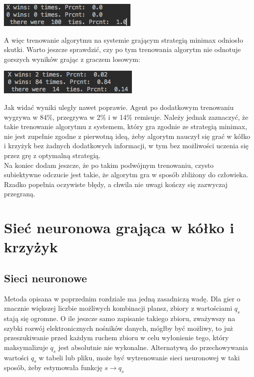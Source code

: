\documentclass[licencjacka]{pracamgr}
\begin{document}
\begin{flushleft}
	\includegraphics [scale=0.7]{QTable_vs_Minimax_trained_d.png}
\end{flushleft}
A więc trenowanie algorytmu na systemie grającym strategią minimax odniosło skutki.  Warto jeszcze sprawdzić, czy po tym trenowania algorytm nie odnotuje gorszych wyników grając z graczem losowym:
\begin{flushleft}
	\includegraphics [scale=0.7]{QTable_vs_Rnd_trained_d.png}
\end{flushleft}
Jak widać wyniki uległy nawet poprawie. Agent po dodatkowym trenowaniu wygrywa w 84\%, przegrywa w 2\% i w 14\% remisuje. Należy jednak zaznaczyć, że takie trenowanie algorytmu z systemem, który gra zgodnie ze strategią minimax, nie jest zupełnie zgodne z pierwotną ideą, żeby algorytm nauczył się grać w kółko i krzyżyk bez żadnych dodatkowych informacji, w tym bez możliwości uczenia się przez grę z optymalną strategią. \\

Na koniec dodam jeszcze, że po takim podwójnym trenowaniu, czysto subiektywne odczucie jest takie, że algorytm gra w sposób zbliżony do człowieka. Rzadko popełnia oczywiste błędy, a chwila nie uwagi kończy się zazwyczaj przegraną. 

 
\chapter{Sieć neuronowa grająca w kółko i krzyżyk }\label{r:Siec}

\section{Sieci neuronowe}
Metoda opisana w poprzednim rozdziale ma jedną zasadniczą wadę. Dla gier o znacznie większej liczbie możliwych kombinacji plansz, zbiory z wartościami $q_{s}$ stają się ogromne. O ile jeszcze samo zapisanie takiego zbioru, zważywszy na szybki rozwój elektronicznych nośników danych, mógłby być możliwy, to już przeszukiwanie przed każdym ruchem zbioru w celu wyłonienie tego, który maksymalizuje $q_{s}$ jest absolutnie nie wykonalne. Alternatywą do przechowywania wartości $q_{s}$ w tabeli lub pliku, może być wytrenowanie sieci neuronowej w taki sposób, żeby estymowała funkcję $s\rightarrow q_{s}$\\
\end{document}
